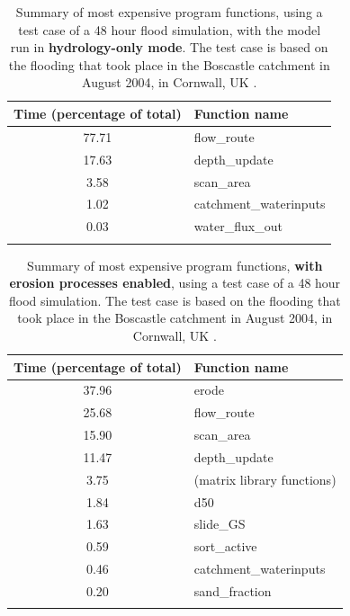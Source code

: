 \begin{table}
\caption{Summary of most expensive program functions, using a test case of a 48 hour flood simulation, with the model run in \textbf{hydrology-only mode}. The test case is based on the flooding that took place in the Boscastle catchment in August 2004, in Cornwall, UK \citep{golding2005boscastle}.}
\begin{tabular}{cl}

\textbf{Time} (percentage of total) & \textbf{Function name} \\
\hline
77.71                                     & flow\_route \\
17.63                                     & depth\_update \\
3.58                                       & scan\_area \\
1.02                                       & catchment\_waterinputs \\
0.03                                       & water\_flux\_out \\
\hline \\
\end{tabular} 
\label{profile_speed_up_hydro}
\end{table}

\begin{table}
\caption{Summary of most expensive program functions, \textbf{with erosion processes enabled}, using a test case of a 48 hour flood simulation. The test case is based on the flooding that took place in the Boscastle catchment in August 2004, in Cornwall, UK \citep{golding2005boscastle}.}
\begin{tabular}{cl}

\textbf{Time} (percentage of total) & \textbf{Function name} \\
\hline 
37.96                                    & erode \\
25.68                                     & flow\_route \\
15.90                                       & scan\_area \\
11.47                                      & depth\_update \\
3.75                                    & (matrix library functions) \\
1.84                                       & d50 \\
1.63                                       & slide\_GS \\
0.59                                      & sort\_active \\
0.46                                      & catchment\_waterinputs \\
0.20                                     & sand\_fraction \\
\hline \\
\end{tabular} 
\label{profile_speed_up_erode}
\end{table}


